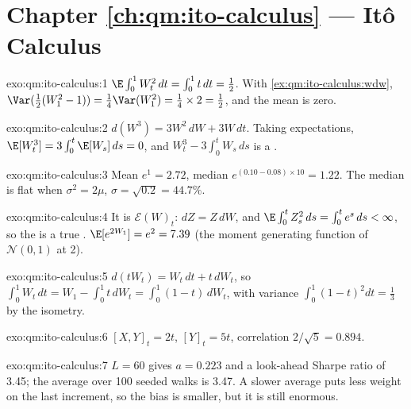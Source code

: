 \section*{Chapter \ref{ch:qm:ito-calculus} --- Itô Calculus}

\begin{solution}{exo:qm:ito-calculus:1}
$\E\int_0^1W_t^2\,dt = \int_0^1t\,dt = \tfrac12$. With \cref{ex:qm:ito-calculus:wdw},
$\Var(\tfrac12(W_1^2 - 1)) = \tfrac14\Var(W_1^2) = \tfrac14 \times 2 = \tfrac12$, and the mean is zero.
\end{solution}

\begin{solution}{exo:qm:ito-calculus:2}
$d(W^3) = 3W^2\,dW + 3W\,dt$. Taking expectations, $\E[W_t^3] = 3\int_0^t\E[W_s]\,ds = 0$, and
$W_t^3 - 3\int_0^tW_s\,ds$ is a .
\end{solution}

\begin{solution}{exo:qm:ito-calculus:3}
Mean $e^{1} = 2.72$, median $e^{(0.10 - 0.08) \times 10} = 1.22$. The median is flat when $\sigma^2 = 2\mu$,
$\sigma = \sqrt{0.2} = 44.7\%$.
\end{solution}

\begin{solution}{exo:qm:ito-calculus:4}
It is $\mathcal E(W)_t$: $dZ = Z\,dW$, and $\E\int_0^tZ_s^2\,ds = \int_0^te^s\,ds < \infty$, so the 
is a true . $\E[e^{2W_1}] = e^{2}= 7.39$ (the moment generating function of $\mathcal
N(0,1)$ at 2).
\end{solution}

\begin{solution}{exo:qm:ito-calculus:5}
$d(tW_t) = W_t\,dt + t\,dW_t$, so $\int_0^1W_t\,dt = W_1 - \int_0^1t\,dW_t = \int_0^1(1 - t)\,dW_t$, with variance
$\int_0^1(1 - t)^2dt = \tfrac13$ by the isometry.
\end{solution}

\begin{solution}{exo:qm:ito-calculus:6}
$[X, Y]_t = 2t$, $[Y]_t = 5t$, correlation $2/\sqrt5 = 0.894$.
\end{solution}

\begin{solution}{exo:qm:ito-calculus:7}
$L = 60$ gives $a = 0.223$ and a look-ahead Sharpe ratio of 3.45; the average over 100 seeded
walks is 3.47. A slower average puts less weight on the last increment, so the bias is smaller,
but it is still enormous.
\end{solution}


